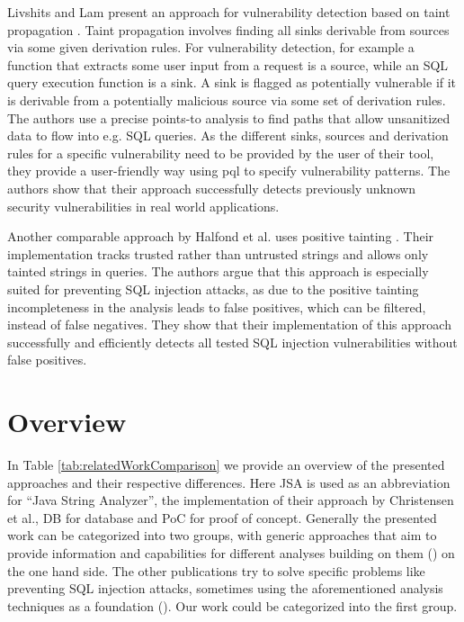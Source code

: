 Livshits and Lam present an approach for vulnerability detection based on taint propagation \cite{livshits2005}.
Taint propagation involves finding all sinks derivable from sources via some given derivation rules. For vulnerability detection, for example a function that extracts some user input from a request is a source, while an SQL query execution function is a sink. A sink is flagged as potentially vulnerable if it is derivable from a potentially malicious source via some set of derivation rules. The authors use a precise points-to analysis to find paths that allow unsanitized data to flow into e.g. SQL queries.
As the different sinks, sources and derivation rules for a specific vulnerability need to be provided by the user of their tool, they provide a user-friendly way using \ac{pql} to specify vulnerability patterns. 
The authors show that their approach successfully detects previously unknown security vulnerabilities in real world applications.

Another comparable approach by Halfond et al. uses positive tainting \cite{wasp}. Their implementation tracks trusted rather than untrusted strings and allows only tainted strings in queries. The authors argue that this approach is especially suited for preventing SQL injection attacks, as due to the positive tainting incompleteness in the analysis leads to false positives, which can be filtered, instead of false negatives. They show that their implementation of this approach successfully and efficiently detects all tested SQL injection vulnerabilities without false positives.

\section{Overview}

In Table \ref{tab:relatedWorkComparison} we provide an overview of the presented approaches and their respective differences. Here JSA is used as an abbreviation for \enquote{Java String Analyzer}, the implementation of their approach by Christensen et al., DB for database and PoC for proof of concept. Generally the presented work can be categorized into two groups, with generic approaches that aim to provide information and capabilities for different analyses building on them (\cite{brics,banshee,regex_types}) on the one hand side. The other publications try to solve specific problems like preventing SQL injection attacks, sometimes using the aforementioned analysis techniques as a foundation (\cite{gould2004static,amnesia,wasp,xduce,xact,livshits2005,sqli_wassermann_su}). Our work could be categorized into the first group.

